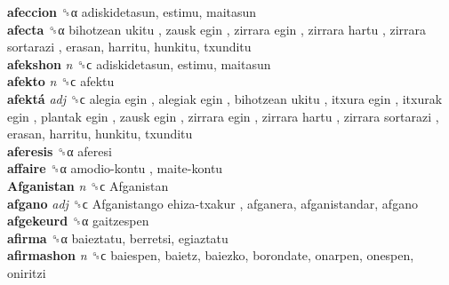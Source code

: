 \textbf{afeccion} ␝α  adiskidetasun, estimu, maitasun  \\
\textbf{afecta} ␝α   bihotzean ukitu ,  zausk egin ,  zirrara egin ,  zirrara hartu ,  zirrara sortarazi , erasan, harritu, hunkitu, txunditu  \\
\textbf{afekshon} \emph{n}  ␝ϲ  adiskidetasun, estimu, maitasun  \\
\textbf{afekto} \emph{n}  ␝ϲ  afektu  \\
\textbf{afektá} \emph{adj}  ␝ϲ   alegia egin ,  alegiak egin ,  bihotzean ukitu ,  itxura egin ,  itxurak egin ,  plantak egin ,  zausk egin ,  zirrara egin ,  zirrara hartu ,  zirrara sortarazi , erasan, harritu, hunkitu, txunditu  \\
\textbf{aferesis} ␝α  aferesi  \\
\textbf{affaire} ␝α   amodio-kontu ,  maite-kontu   \\
\textbf{Afganistan} \emph{n}  ␝ϲ   Afganistan   \\
\textbf{afgano} \emph{adj}  ␝ϲ   Afganistango ehiza-txakur , afganera, afganistandar, afgano  \\
\textbf{afgekeurd} ␝α  gaitzespen  \\
\textbf{afirma} ␝α  baieztatu, berretsi, egiaztatu  \\
\textbf{afirmashon} \emph{n}  ␝ϲ  baiespen, baietz, baiezko, borondate, onarpen, onespen, oniritzi  \\
